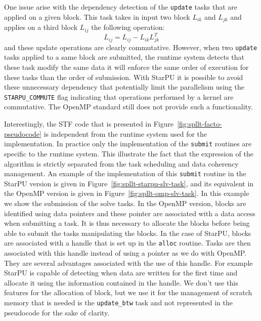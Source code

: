 \documentclass{article}
\newcommand{\starpu}{{StarPU}\xspace}
\newcommand{\openmp}{OpenMP\xspace}
\begin{document}
One issue arise with the dependency detection of the \texttt{update}
tasks that are applied on a given block. This task takes in input two
block $L_{ik}$ and $L_{jk}$ and applies on a third block $L_{ij}$ the
following operation:
\begin{equation*}
  L_{ij} = L_{ij} - L_{ik}L_{jk}^{T}
\end{equation*}
and these update operations are clearly commutative. However, when two
\texttt{update} tasks applied to a same block are submitted, the
runtime system detects that these task modify the same data it will
enforce the same order of execution for these tasks than the order of
submission. With StarPU it is possible to avoid these unnecessary
dependency that potentially limit the parallelism using the
\texttt{STARPU\_COMMUTE} flag indicating that operations performed by
a kernel are commutative. The OpenMP standard still does not provide
such a functionality.

Interestingly, the STF code that is presented in
Figure~\ref{fig:spllt-facto-pseudocode} is independent from the
runtime system used for the implementation. In practice only the
implementation of the \texttt{submit} routines are specific to the
runtime system. This illustrate the fact that the expression of the
algorithm is strictly separated from the task scheduling and data
coherency management. An example of the implementation of this
\texttt{submit} routine in the \starpu version is given in
Figure~\ref{fig:spllt-starpu-slv-task}, and its equivalent in the
\openmp version is given in Figure~\ref{fig:spllt-omp-slv-task}. In
this example we show the submission of the solve tasks. In the \openmp
version, blocks are identified using data pointers and these pointer
are associated with a data access when submitting a task. It is thus
necessary to allocate the blocks before being able to submit the tasks
manipulating the blocks. In the case of \starpu, blocks are associated
with a handle that is set up in the \texttt{alloc} routine. Tasks are
then associated with this handle instead of using a pointer as we do
with \openmp. They are several advantages associated with the use of
this handle. For example \starpu is capable of detecting when data are
written for the first time and allocate it using the information
contained in the handle. We don't use this features for the allocation
of block, but we use it for the management of scratch memory that is
needed is the \texttt{update\_btw} task and not represented in the
pseudocode for the sake of clarity.
\end{document}
